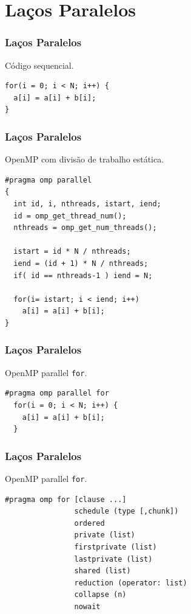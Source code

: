 \documentclass[xcolor={usenames,dvipsnames},12pt,presentation,aspectratio=169]{beamer}
\begin{document}
\section{Laços Paralelos}
\begin{frame}[fragile]
  \frametitle{Laços Paralelos}
%
Código sequencial.
\begin{minipage}{0.95\textwidth}  
  \begin{verbatim}  
for(i = 0; i < N; i++) {
  a[i] = a[i] + b[i];
}
\end{verbatim}
\end{minipage}
\end{frame}
\begin{frame}[fragile]
  \frametitle{Laços Paralelos}
OpenMP com divisão de trabalho estática.
\begin{minipage}{0.95\textwidth}  
  \begin{verbatim}
#pragma omp parallel
{
  int id, i, nthreads, istart, iend;
  id = omp_get_thread_num();
  nthreads = omp_get_num_threads();

  istart = id * N / nthreads;
  iend = (id + 1) * N / nthreads;
  if( id == nthreads-1 ) iend = N;

  for(i= istart; i < iend; i++) 
    a[i] = a[i] + b[i];
}
\end{verbatim}
\end{minipage}
\end{frame}
\begin{frame}[fragile]
  \frametitle{Laços Paralelos}
OpenMP parallel \texttt{for}.
\begin{minipage}{0.95\textwidth}  
\begin{verbatim}
#pragma omp parallel for
  for(i = 0; i < N; i++) {
    a[i] = a[i] + b[i];
  }
\end{verbatim}
\end{minipage}
\end{frame}
\begin{frame}[fragile]
  \frametitle{Laços Paralelos}
OpenMP parallel \texttt{for}.
\begin{minipage}{0.95\textwidth}  
\begin{verbatim}
#pragma omp for [clause ...]
                schedule (type [,chunk]) 
                ordered
                private (list) 
                firstprivate (list) 
                lastprivate (list) 
                shared (list) 
                reduction (operator: list) 
                collapse (n) 
                nowait 
\end{verbatim}
\end{minipage}
\end{frame}
\end{document}
